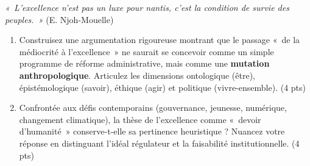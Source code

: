 \documentclass[11pt]{article}
\begin{document}
\begin{exercice}
\textit{« L'excellence n'est pas un luxe pour nantis, c'est la condition de survie des peuples. »} (E. Njoh-Mouelle)
\begin{enumerate}
    \item Construisez une argumentation rigoureuse montrant que le passage « de la médiocrité à l'excellence » ne saurait se concevoir comme un simple programme de réforme administrative, mais comme une \textbf{mutation anthropologique}. Articulez les dimensions ontologique (être), épistémologique (savoir), éthique (agir) et politique (vivre-ensemble). (4 pts)
    \item Confrontée aux défis contemporains (gouvernance, jeunesse, numérique, changement climatique), la thèse de l'excellence comme « devoir d'humanité » conserve-t-elle sa pertinence heuristique ? Nuancez votre réponse en distinguant l'idéal régulateur et la faisabilité institutionnelle. (4 pts)
\end{enumerate}
\end{exercice}
\end{document}
